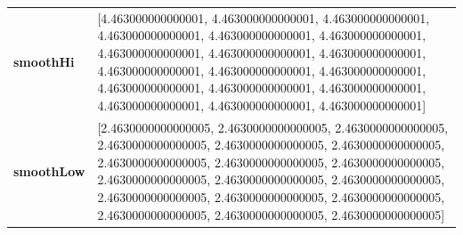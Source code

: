 			\begin{table}[H]
				\centering
				\begin{tabularx}{\textwidth}{lX}
		\textbf{smoothHi}& [4.463000000000001, 4.463000000000001, 4.463000000000001, 4.463000000000001, 4.463000000000001, 4.463000000000001, 4.463000000000001, 4.463000000000001, 4.463000000000001, 4.463000000000001, 4.463000000000001, 4.463000000000001, 4.463000000000001, 4.463000000000001, 4.463000000000001, 4.463000000000001, 4.463000000000001, 4.463000000000001]\\ 
		\textbf{smoothLow} &[2.4630000000000005, 2.4630000000000005, 2.4630000000000005, 2.4630000000000005, 2.4630000000000005, 2.4630000000000005, 2.4630000000000005, 2.4630000000000005, 2.4630000000000005, 2.4630000000000005, 2.4630000000000005, 2.4630000000000005, 2.4630000000000005, 2.4630000000000005, 2.4630000000000005, 2.4630000000000005, 2.4630000000000005, 2.4630000000000005]\\
		
	\end{tabularx} 
\end{table}
